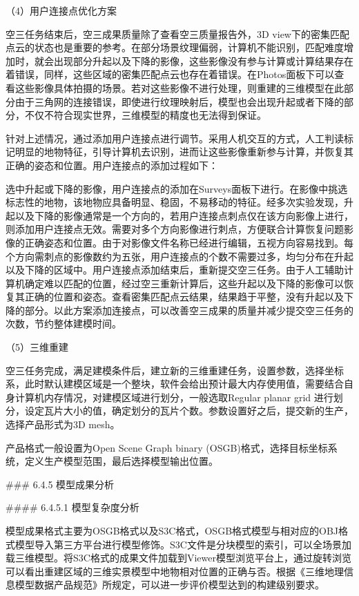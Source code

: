（4）用户连接点优化方案

空三任务结束后，空三成果质量除了查看空三质量报告外，3D view下的密集匹配点云的状态也是重要的参考。在部分场景纹理偏弱，计算机不能识别，匹配难度增加时，就会出现部分升起以及下降的影像，这些影像没有参与计算或计算结果存在着错误，同样，这些区域的密集匹配点云也存在着错误。在Photos面板下可以查看这些影像具体拍摄的场景。若对这些影像不进行处理，则重建的三维模型在此部分由于三角网的连接错误，即使进行纹理映射后，模型也会出现升起或者下降的部分，不仅不符合现实世界，三维模型的精度也无法得到保证。

针对上述情况，通过添加用户连接点进行调节。采用人机交互的方式，人工判读标记明显的地物特征，引导计算机去识别，进而让这些影像重新参与计算，并恢复其正确的姿态和位置。用户连接点的添加过程如下：

选中升起或下降的影像，用户连接点的添加在Surveys面板下进行。在影像中挑选标志性的地物，该地物应具备明显、稳固，不易移动的特征。经多次实验发现，升起以及下降的影像通常是一个方向的，若用户连接点刺点仅在该方向影像上进行，则添加用户连接点无效。需要对多个方向影像进行刺点，方便联合计算恢复问题影像的正确姿态和位置。由于对影像文件名称已经进行编辑，五视方向容易找到。每个方向需刺点的影像数约为五张，用户连接点的个数不需要过多，均匀分布在升起以及下降的区域中。用户连接点添加结束后，重新提交空三任务。由于人工辅助计算机确定难以匹配的位置，经过空三重新计算后，这些升起以及下降的影像可以恢复其正确的位置和姿态。查看密集匹配点云结果，结果趋于平整，没有升起以及下降的部分。以此方案添加连接点，可以改善空三成果的质量并减少提交空三任务的次数，节约整体建模时间。

（5）三维重建

空三任务完成，满足建模条件后，建立新的三维重建任务，设置参数，选择坐标系，此时默认建模区域是一个整块，软件会给出预计最大内存使用值，需要结合自身计算机内存情况，对建模区域进行划分，一般选取Regular planar grid 进行划分，设定瓦片大小的值，确定划分的瓦片个数。参数设置好之后，提交新的生产，选择产品形式为3D mesh。

产品格式一般设置为Open Scene Graph binary (OSGB)格式，选择目标坐标系统，定义生产模型范围，最后选择模型输出位置。

\#\#\# 6.4.5 模型成果分析

\#\#\#\# 6.4.5.1 模型复杂度分析

模型成果格式主要为OSGB格式以及S3C格式，OSGB格式模型与相对应的OBJ格式模型导入第三方平台进行模型修饰。S3C文件是分块模型的索引，可以全场景加载三维模型。将S3C格式的成果文件加载到Viewer模型浏览平台上，通过旋转浏览可以看出重建区域的三维实景模型中地物相对位置的正确与否。根据《三维地理信息模型数据产品规范》所规定，可以进一步评价模型达到的构建级别要求。

